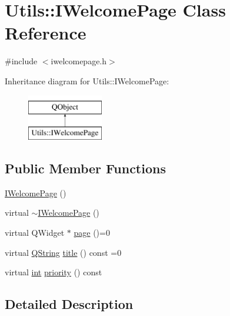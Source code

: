 \hypertarget{class_utils_1_1_i_welcome_page}{\section{Utils\-:\-:I\-Welcome\-Page Class Reference}
\label{class_utils_1_1_i_welcome_page}
}


{\ttfamily \#include $<$iwelcomepage.\-h$>$}

Inheritance diagram for Utils\-:\-:I\-Welcome\-Page\-:\begin{figure}[H]
\begin{center}
\leavevmode
\includegraphics[height=2.000000cm]{class_utils_1_1_i_welcome_page}
\end{center}
\end{figure}
\subsection*{Public Member Functions}
\begin{DoxyCompactItemize}
\item 
\hyperlink{class_utils_1_1_i_welcome_page_aed453f256cbac27f1c02cce434e8531f}{I\-Welcome\-Page} ()
\item 
virtual \hyperlink{class_utils_1_1_i_welcome_page_a5e7ed8aa18c2b6c229c0c72f47928d13}{$\sim$\-I\-Welcome\-Page} ()
\item 
virtual Q\-Widget $\ast$ \hyperlink{class_utils_1_1_i_welcome_page_a719dd6d3f8d327b9fa27479f875e5554}{page} ()=0
\item 
virtual \hyperlink{group___u_a_v_objects_plugin_gab9d252f49c333c94a72f97ce3105a32d}{Q\-String} \hyperlink{class_utils_1_1_i_welcome_page_ab1712be5a8b48bfae8d76a2ecb0660ae}{title} () const =0
\item 
virtual \hyperlink{ioapi_8h_a787fa3cf048117ba7123753c1e74fcd6}{int} \hyperlink{class_utils_1_1_i_welcome_page_a59dc114cfe72095ed7fbe36fc3f9b2fc}{priority} () const 
\end{DoxyCompactItemize}


\subsection{Detailed Description}


